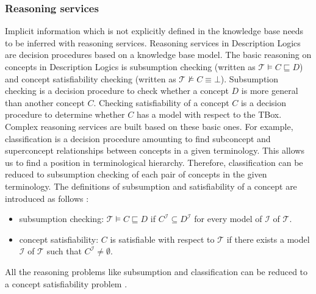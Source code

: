 \documentclass{article}
\begin{document}
\subsubsection{Reasoning services}
Implicit information which is not explicitly defined in the knowledge base needs to be inferred with reasoning services.
Reasoning services in Description Logics are decision procedures based on a knowledge base model. 
The basic reasoning on concepts in Description Logics is subsumption checking (written as $\mathcal{T}\vDash C\sqsubseteq D$) and 
concept satisfiability checking (written as $\mathcal{T}\nvDash C\equiv \bot$).
Subsumption checking is a decision procedure to check whether a concept $D$ is more general than another concept $C$.
Checking satisfiability of a concept $C$ is a decision procedure to determine whether $C$ has a model with respect to the TBox.
Complex reasoning services are built based on these basic ones. For example, classification is a decision procedure amounting to find subconcept and superconcept 
relationships between concepts in a given terminology. This allows us to find a position in terminological hierarchy.
Therefore, classification can be reduced to subsumption checking of each pair of concepts in the given terminology.
The definitions of subsumption and satisfiability of a concept are introduced as follows \cite{baader2003description}:
\begin{itemize}
\item subsumption checking: $\mathcal{T}\vDash C\sqsubseteq D$ if $C^\mathcal{I}\subseteq D^\mathcal{I}$ for every model of $\mathcal{I}$ of $\mathcal{T}$.
\item concept satisfiability: $C$ is satisfiable with respect to $\mathcal{T}$ if there exists a model $\mathcal{I}$ of $\mathcal{T}$ such that $C^\mathcal{I}\neq \emptyset$.
\end{itemize}
All the reasoning problems like subsumption and classification can be reduced to a concept satisfiability problem \cite{baader2003description}.
\end{document}
